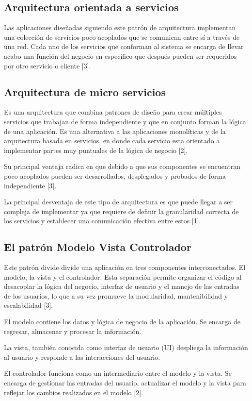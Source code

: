\subsection{Arquitectura orientada a servicios}

Las aplicaciones diseñadas siguiendo este patrón de arquitectura implementan una colección de servicios poco acoplados que se comunican entre sí a través de una red.
Cada uno de los servicios que conforman al sistema se encarga de llevar acabo una función del negocio en específico que después pueden ser requeridos por otro servicio o cliente [3].


\subsection{Arquitectura de micro servicios}

Es una arquitectura que combina patrones de diseño para crear múltiples servicios que trabajan de forma independiente y que en conjunto forman la lógica de una aplicación. Es una alternativa a las aplicaciones monolíticas y de la arquitectura basada en servicios, en donde cada servicio esta orientado a implementar partes muy puntuales de la lógica de negocio [2].

Su principal ventaja radica en que debido a que sus componentes se encuentran poco acoplados pueden ser desarrollados, desplegados y probados de forma independiente [3].

La principal desventaja de este tipo de arquitectura es que puede llegar a ser compleja de implementar ya que requiere de definir la granularidad correcta de los servicios y establecer una comunicación efectiva entre estos [1].

\subsection{El patrón Modelo Vista Controlador}

Este patrón divide divide una aplicación en tres componentes interconectados. El modelo, la vista y el controlador. Esta separación permite organizar el código al desacoplar la lógica del negocio, interfaz de usuario y el manejo de las entradas de los usuarios, lo que a su vez promueve la modularidad, mantenibilidad y escalabilidad [3]. 

El modelo contiene los datos y lógica de negocio de la aplicación. Se encarga de regresar, almacenar y procesar la información.

La vista, también conocida como interfaz de usuario (UI) despliega la información al usuario y responde a las interacciones del usuario.

El controlador funciona como un intermediario entre el modelo y la vista. Se encarga de gestionar las entradas del usuario, actualizar el modelo y la vista para reflejar los cambios realizados en el modelo [2].
